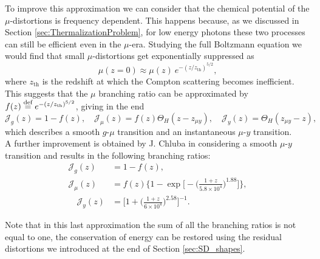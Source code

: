 To improve this approximation we can consider that the chemical potential of the $\mu$-distortions is frequency dependent. This happens because, as we discussed in Section \ref{sec:ThermalizationProblem}, for low energy photons these two processes can still be efficient even in the $\mu$-era. Studying the full Boltzmann equation we would find that small $\mu$-distortions get exponentially suppressed as \cite{Danese_82} 
\begin{equation}
    \label{eq:SD_mu_freq}
    \mu(z=0)\approx\mu(z)\ e^{-(z/z_{\text{th}})^{5/2}},
\end{equation}
where $z_{\text{th}}$ is the redshift at which the Compton scattering becomes inefficient. This suggests that the $\mu$ branching ratio can be approximated by $f(z)\stackrel{\text{def}}{=} e^{-(z/z_{\text{th}})^{5/2}}$, giving in the end
\begin{equation}
    \mathcal{J}_g(z)=1-f(z),\quad \mathcal{J}_\mu(z)=f(z)\Theta_{H}(z-z_{\mu y}),\quad \mathcal{J}_y(z)=\Theta_{H}(z_{\mu y}-z), \label{eq:BR_soft}
\end{equation}
which describes a smooth $g$-$\mu$ transition and an instantaneous $\mu$-$ y$ transition.\\A further improvement is obtained by J. Chluba in \cite{Chluba_Green} considering a smooth $\mu$-$ y$ transition and results in the following branching ratios:
\begin{subequations}\label{eq:BR_soft_soft}
 \begin{align}
    \mathcal{J}_g(z)&=1-f(z),\\ \mathcal{J}_\mu(z)&=f(z)\Bigg\{1-\exp\Bigg[-\bigg(\frac{1+z}{5.8\times10^4}\bigg)^{1.88}\Bigg]\Bigg\},\\\quad \mathcal{J}_y(z)&=\Bigg[1+\bigg(\frac{1+z}{6\times10^{4}}\bigg)^{2.58}\Bigg]^{-1}.
\end{align}   
\end{subequations}

Note that in this last approximation the sum of all the branching ratios is not equal to one, the conservation of energy can be restored using the residual distortions we introduced at the end of Section \ref{sec:SD_shapes}. 

